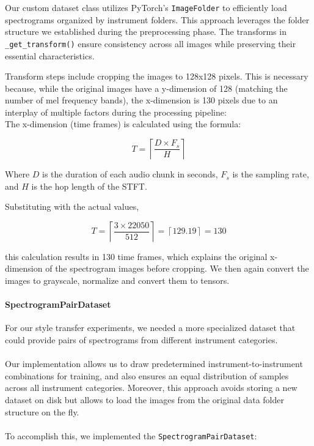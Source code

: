 Our custom dataset class utilizes PyTorch's \texttt{ImageFolder} to efficiently load spectrograms organized by instrument folders. 
This approach leverages the folder structure we established during the preprocessing phase. 
The transforms in \texttt{\_get\_transform()} ensure consistency across all images while preserving their essential characteristics. 

Transform steps include cropping the images to 128x128 pixels. 
This is necessary because, while the original images have a y-dimension of 128 (matching the number of mel frequency bands), 
the x-dimension is 130 pixels due to an interplay of multiple factors during the processing pipeline:
\\

The x-dimension (time frames) is calculated using the formula:

\[
T = \left\lceil \frac{D \times F_s}{H} \right\rceil
\]

Where \(D\) is the duration of each audio chunk in seconds, \(F_s\) is the sampling rate, and \(H\) is the hop length of the STFT.

Substituting with the actual values,

\[
T = \left\lceil \frac{3 \times 22050}{512} \right\rceil = \left\lceil 129.19 \right\rceil = 130
\]

this calculation results in 130 time frames, which explains the original x-dimension of the spectrogram images before cropping.
We then again convert the images to grayscale, normalize and convert them to tensors.


\paragraph{SpectrogramPairDataset}
For our style transfer experiments, we needed a more specialized dataset that could provide pairs of spectrograms from different instrument categories.
\\\\ 
Our implementation allows us to draw predetermined instrument-to-instrument combinations for training, and also ensures an equal distribution of samples across all instrument categories.
Moreover, this approach avoids storing a new dataset on disk but allows to load the images from the original data folder structure on the fly.
\\\\
To accomplish this, we implemented the \texttt{SpectrogramPairDataset}:

